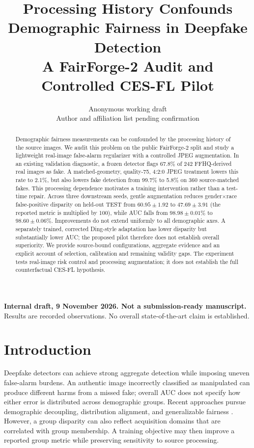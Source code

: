 \documentclass[10pt,twocolumn,letterpaper]{article}
\title{Processing History Confounds Demographic Fairness in Deepfake Detection\\
\large A FairForge-2 Audit and Controlled CES-FL Pilot}
\author{Anonymous working draft\\Author and affiliation list pending confirmation}
\begin{document}
\maketitle
\begin{center}
\small\textbf{Internal draft, 9 November 2026. Not a submission-ready manuscript.}\\
Results are recorded observations. No overall state-of-the-art claim is established.
\end{center}

\begin{abstract}
Demographic fairness measurements can be confounded by the processing history of the source images.
We audit this problem on the public FairForge-2 split and study a lightweight real-image false-alarm regularizer
with a controlled JPEG augmentation. In an existing validation diagnostic, a frozen detector flags 67.8\% of 242
FFHQ-derived real images as fake. A matched-geometry, quality-75, 4:2:0 JPEG treatment lowers this rate to 2.1\%,
but also lowers fake detection from 99.7\% to 5.8\% on 360 source-matched fakes.
This processing dependence motivates a training intervention rather than a test-time repair.
Across three downstream seeds, gentle augmentation reduces gender$\times$race false-positive disparity on held-out
TEST from $60.95\pm1.92$ to $47.69\pm3.91$ (the reported metric is multiplied by 100), while AUC falls from
$98.98\pm0.01$\% to $98.60\pm0.06$\%. Improvements do not extend uniformly to all demographic axes.
A separately trained, corrected Ding-style adaptation has lower disparity but substantially lower AUC;
the proposed pilot therefore does not establish overall superiority.
We provide source-bound configurations, aggregate evidence and an explicit account of selection,
calibration and remaining validity gaps. The experiment tests real-image risk control and processing augmentation;
it does not establish the full counterfactual CES-FL hypothesis.
\end{abstract}

\section{Introduction}
Deepfake detectors can achieve strong aggregate detection while imposing uneven false-alarm burdens.
An authentic image incorrectly classified as manipulated can produce different harms from a missed fake;
overall AUC does not specify how either error is distributed across demographic groups.
Recent approaches pursue demographic decoupling, distribution alignment, and generalizable fairness
\cite{ding2025,lin2024,zhang2026}. However, a group disparity can also reflect acquisition domains that are
correlated with group membership. A training objective may then improve a reported group metric while
preserving sensitivity to source processing.
\end{document}
